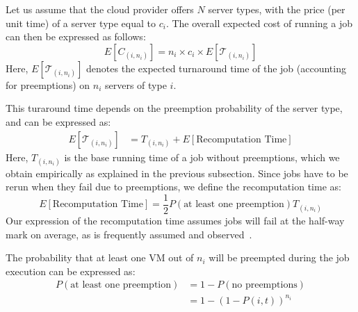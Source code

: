 Let us assume that the cloud provider offers $N$ server types, with the price (per unit time) of a server type equal to $c_i$. 
The overall expected cost of running a job can then be expressed as follows:
\begin{equation}
  \label{eq:e-cost}
  E[C_{( i,n_i )}] = n_i\times c_i \times E[\mathcal{T}_{( i,n_i )}]
\end{equation}
Here, $E[\mathcal{T}_{( i,n_i )}]$ denotes the expected turnaround time of the job (accounting for preemptions) on $n_i$ servers of type $i$.

This turaround time depends on the preemption probability of the server type, and can be expressed as:
\begin{align}
  \label{eq:turnaround}
  E[\mathcal{T}_{( i,n_i )}] &= T_{( i,n_i )} + E[\text{Recomputation Time}]
\end{align}
Here, $T_{( i,n_i )}$ is the base running time of a job without preemptions, which we obtain empirically as explained in the previous subsection.
Since jobs have to be rerun when they fail due to preemptions, we define the recomputation time as:
\begin{equation}
  \label{eq:recomput}
   E[\text{Recomputation Time}] = \frac{1}{2} P(\text{at least one preemption}) T_{( i,n_i )}   
 \end{equation}
Our expression of the recomputation time assumes jobs will fail at the half-way mark on average, as is frequently assumed and observed~\cite{daly2006higher, bougeret_checkpointing_2011}. 

The probability that at least one VM out of $n_i$ will be preempted during the job execution can be expressed as:
\begin{align}
  \label{eq:pfail1}
  P(\text{at least one preemption}) &= 1-P(\text{no preemptions}) \\
                                 &= 1-\left(1-P\left(i, t\right)\right)^{n_i}
\end{align}


